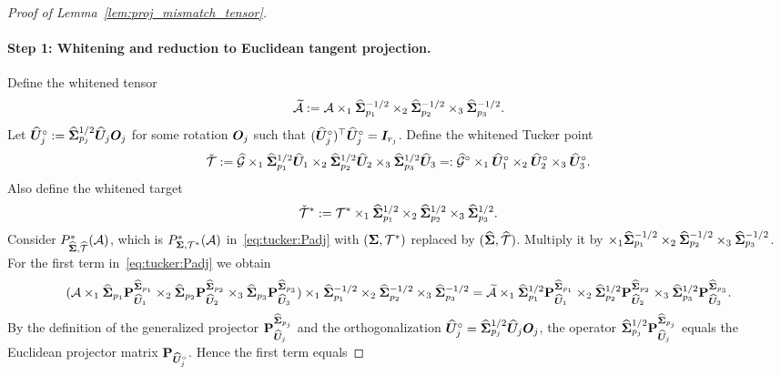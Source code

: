 \documentclass[authoryear,preprint,review,12pt]{elsarticle}
\begin{document}
{\begin{proof}[Proof of Lemma~\ref{lem:proj_mismatch_tensor}]
		\paragraph{Step 1: Whitening and reduction to Euclidean tangent projection.}
		Define the whitened tensor
		\[
		\widetilde{\mathcal{A}}:=\mathcal{A}\times_1\widehat{\mathbf{ \Sigma}}_{p_1}^{-1/2}\times_2\widehat{\mathbf{ \Sigma}}_{p_2}^{-1/2}\times_3\widehat{\mathbf{ \Sigma}}_{p_3}^{-1/2}.
		\]
		Let $\widehat{\boldsymbol U}_j^\circ:=\widehat{\mathbf{ \Sigma}}_{p_j}^{1/2}\widehat{\boldsymbol U}_j\boldsymbol O_j$ for some rotation $\boldsymbol O_j$ such that
		$(\widehat{\boldsymbol U}_j^\circ)^\top\widehat{\boldsymbol U}_j^\circ=\boldsymbol I_{r_j}$.
		Define the whitened Tucker point
		\[
		\check{\mathcal{T}}
		:=\widehat{\mathcal G}\times_1\widehat{\mathbf{ \Sigma}}_{p_1}^{1/2}\widehat{\boldsymbol U}_1
		\times_2\widehat{\mathbf{ \Sigma}}_{p_2}^{1/2}\widehat{\boldsymbol U}_2
		\times_3\widehat{\mathbf{ \Sigma}}_{p_3}^{1/2}\widehat{\boldsymbol U}_3
		=:\widehat{\mathcal G}^\circ\times_1\widehat{\boldsymbol U}_1^\circ\times_2\widehat{\boldsymbol U}_2^\circ\times_3\widehat{\boldsymbol U}_3^\circ .
		\]
		Also define the whitened target
		\[
		\check{\mathcal{T}}^\ast
		:=\mathcal{T}^\ast\times_1\widehat{\mathbf{ \Sigma}}_{p_1}^{1/2}\times_2\widehat{\mathbf{ \Sigma}}_{p_2}^{1/2}\times_3\widehat{\mathbf{ \Sigma}}_{p_3}^{1/2}.
		\]
		Consider $P_{\widehat{\mathbf{ \Sigma}},\widehat{\mathcal{T}}}^\ast(\mathcal{A})$, which is $P_{\mathbf{ \Sigma},\mathcal{T}^\ast}^\ast(\mathcal{A})$ in~\eqref{eq:tucker:Padj}
		with $(\mathbf{ \Sigma},\mathcal{T}^\ast)$ replaced by $(\widehat{\mathbf{ \Sigma}},\widehat{\mathcal{T}})$.  Multiply it by
		$\times_1\widehat{\mathbf{ \Sigma}}_{p_1}^{-1/2}\times_2\widehat{\mathbf{ \Sigma}}_{p_2}^{-1/2}\times_3\widehat{\mathbf{ \Sigma}}_{p_3}^{-1/2}$.
		For the first term in~\eqref{eq:tucker:Padj} we obtain
		\[
		(\mathcal{A}\times_1\widehat{\mathbf{ \Sigma}}_{p_1}\mathbf{P}_{\widehat{\boldsymbol U}_1}^{\widehat{\mathbf{ \Sigma}}_{p_1}}
		\times_2\widehat{\mathbf{ \Sigma}}_{p_2}\mathbf{P}_{\widehat{\boldsymbol U}_2}^{\widehat{\mathbf{ \Sigma}}_{p_2}}
		\times_3\widehat{\mathbf{ \Sigma}}_{p_3}\mathbf{P}_{\widehat{\boldsymbol U}_3}^{\widehat{\mathbf{ \Sigma}}_{p_3}})
		\times_1\widehat{\mathbf{ \Sigma}}_{p_1}^{-1/2}\times_2\widehat{\mathbf{ \Sigma}}_{p_2}^{-1/2}\times_3\widehat{\mathbf{ \Sigma}}_{p_3}^{-1/2}
		=
		\widetilde{\mathcal{A}}\times_1 \widehat{\mathbf{ \Sigma}}_{p_1}^{1/2}\mathbf{P}_{\widehat{\boldsymbol U}_1}^{\widehat{\mathbf{ \Sigma}}_{p_1}}
		\times_2 \widehat{\mathbf{ \Sigma}}_{p_2}^{1/2}\mathbf{P}_{\widehat{\boldsymbol U}_2}^{\widehat{\mathbf{ \Sigma}}_{p_2}}
		\times_3 \widehat{\mathbf{ \Sigma}}_{p_3}^{1/2}\mathbf{P}_{\widehat{\boldsymbol U}_3}^{\widehat{\mathbf{ \Sigma}}_{p_3}}.
		\]
		By the definition of the generalized projector $\mathbf{P}_{\widehat{\boldsymbol U}_j}^{\widehat{\mathbf{ \Sigma}}_{p_j}}$ and the orthogonalization
		$\widehat{\boldsymbol U}_j^\circ=\widehat{\mathbf{ \Sigma}}_{p_j}^{1/2}\widehat{\boldsymbol U}_j\boldsymbol O_j$, the operator
		$\widehat{\mathbf{ \Sigma}}_{p_j}^{1/2}\mathbf{P}_{\widehat{\boldsymbol U}_j}^{\widehat{\mathbf{ \Sigma}}_{p_j}}$ equals the Euclidean projector matrix
		$\mathbf{P}_{\widehat{\boldsymbol U}_j^\circ}$. Hence the first term equals

\end{proof}}
\end{document}
